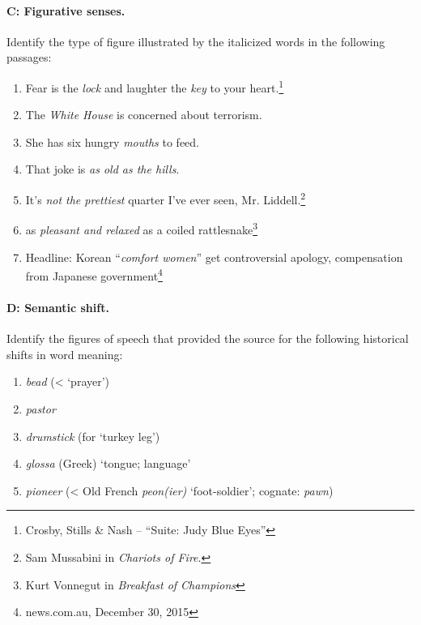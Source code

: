 {\paragraph*{C: Figurative senses.}

Identify the type of figure illustrated by the italicized words in the following passages:

\begin{enumerate}[noitemsep]
\item Fear is the \textit{lock} and laughter the \textit{key} to your heart.\footnote{Crosby, Stills \& Nash – “Suite: Judy Blue Eyes”}
\item The \textit{White House} is concerned about terrorism.
\item She has six hungry \textit{mouths} to feed.
\item That joke is \textit{as old as the hills}.
\item It’s \textit{not the prettiest} quarter I’ve ever seen, Mr. Liddell.\footnote{Sam Mussabini in \textit{Chariots of Fire}.}
\item as \textit{pleasant and relaxed} as a coiled rattlesnake\footnote{Kurt Vonnegut in \textit{Breakfast of Champions}}
\item Headline: {Korean} “\textit{comfort women}” get controversial apology, compensation from {Japanese} government\footnote{news.com.au, December 30, 2015}
\end{enumerate}

\paragraph*{D: Semantic shift.}

Identify the figures of speech that provided the source for the following historical shifts in word meaning:

\begin{enumerate}[noitemsep]
\item  \textit{bead} (< ‘prayer’)
\item  \textit{pastor}
\item  \textit{drumstick} (for ‘turkey leg’)
\item  \textit{glossa} ({Greek}) ‘tongue; language’
\item  \textit{pioneer} (< Old {French} \textit{peon(ier)} ‘foot-soldier’; cognate: \textit{pawn})
\end{enumerate}
}

